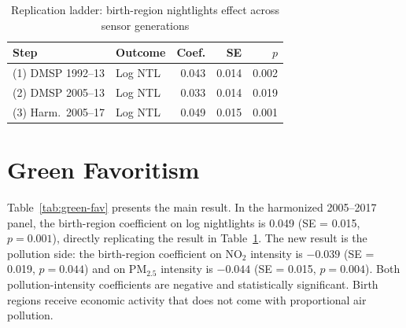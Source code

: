 \documentclass[9pt,twocolumn,twoside]{pnas-new}
\begin{document}
\begin{table}[t]
\centering
\caption{Replication ladder: birth-region nightlights effect across sensor generations}
\small
\begin{tabular*}{\columnwidth}{@{\extracolsep{\fill}}llrrr}
Step & Outcome & Coef. & SE & $p$ \\
\midrule
(1) DMSP 1992--13 & Log NTL & 0.043 & 0.014 & 0.002 \\
(2) DMSP 2005--13 & Log NTL & 0.033 & 0.014 & 0.019 \\
(3) Harm.\ 2005--17 & Log NTL & 0.049 & 0.015 & 0.001 \\
\bottomrule
\end{tabular*}
\label{tab:replication}
\end{table}

\section{Green Favoritism}

Table~\ref{tab:green-fav} presents the main result. In the harmonized 2005--2017 panel, the birth-region coefficient on log nightlights is 0.049 (SE = 0.015, $p = 0.001$), directly replicating the result in Table~\ref{tab:replication}. The new result is the pollution side: the birth-region coefficient on NO$_2$ intensity is $-0.039$ (SE = 0.019, $p = 0.044$) and on PM$_{2.5}$ intensity is $-0.044$ (SE = 0.015, $p = 0.004$). Both pollution-intensity coefficients are negative and statistically significant. Birth regions receive economic activity that does not come with proportional air pollution.
\end{document}
